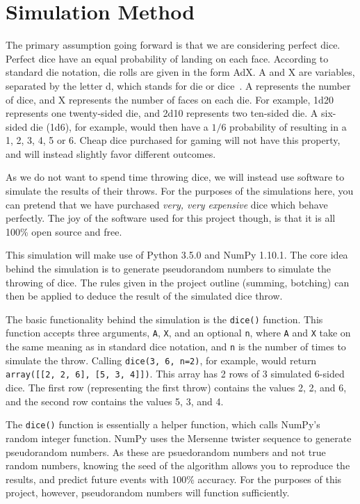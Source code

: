 \documentclass{article}
\begin{document}
\section{Simulation Method}
The primary assumption going forward is that we are considering perfect dice. Perfect dice have an equal probability of landing on each face. According to standard die notation, die rolls are given in the form AdX. A and X are variables, separated by the letter d, which stands for die or dice~\cite{dice_notation}. A represents the number of dice, and X represents the number of faces on each die. For example, 1d20 represents one twenty-sided die, and 2d10 represents two ten-sided die. A six-sided die (1d6), for example, would then have a $1/6$ probability of resulting in a 1, 2, 3, 4, 5 or 6. Cheap dice purchased for gaming will not have this property, and will instead slightly favor different outcomes.

As we do not want to spend time throwing dice, we will instead use software to simulate the results of their throws. For the purposes of the simulations here, you can pretend that we have purchased \textit{very, very expensive} dice which behave perfectly. The joy of the software used for this project though, is that it is all 100\% open source and free.

This simulation will make use of Python 3.5.0 and NumPy 1.10.1. The core idea behind the simulation is to generate pseudorandom numbers to simulate the throwing of dice. The rules given in the project outline (summing, botching) can then be applied to deduce the result of the simulated dice throw.

The basic functionality behind the simulation is the \texttt{dice()} function. This function accepts three arguments, \texttt{A}, \texttt{X}, and an optional \texttt{n}, where \texttt{A} and \texttt{X} take on the same meaning as in standard dice notation, and \texttt{n} is the number of times to simulate the throw. Calling \texttt{dice(3, 6, n=2)}, for example, would return \texttt{array([[2, 2, 6], [5, 3, 4]])}. This array has 2 rows of 3 simulated 6-sided dice. The first row (representing the first throw) contains the values 2, 2, and 6, and the second row contains the values 5, 3, and 4.

The \texttt{dice()} function is essentially a helper function, which calls NumPy's random integer function. NumPy uses the Mersenne twister sequence to generate pseudorandom numbers. As these are psuedorandom numbers and not true random numbers, knowing the seed of the algorithm allows you to reproduce the results, and predict future events with 100\% accuracy. For the purposes of this project, however, pseudorandom numbers will function sufficiently.
\end{document}
